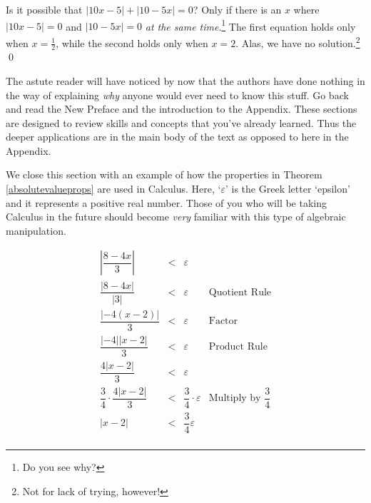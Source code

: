 \documentclass{ximera}
\begin{document}
\begin{example}
\begin{enumerate}
 

Is it possible that $|10x - 5| + |10 - 5x| = 0$?  Only if there is an $x$ where $|10x-5| = 0$ and $|10-5x| = 0$ \textit{at the same time}.\footnote{Do you see why?}  The first equation holds only when $x = \frac{1}{2}$, while the second holds only when $x = 2$.  Alas, we have no solution.\footnote{Not for lack of trying, however!}   \qed

\end{enumerate}

\end{example}

The astute reader will have noticed by now that the authors have done nothing in the way of explaining \emph{why} anyone would ever need to know this stuff.  Go back and read the New Preface and the introduction to the Appendix.  These sections are designed to review skills and concepts that you've already learned.  Thus the deeper applications are in the main body of the text as opposed to here in the Appendix.  

 

We close this section with an example of how the properties in Theorem \ref{absolutevalueprops} are used in Calculus.  Here, `$\varepsilon$' is the Greek letter `epsilon' and it represents a positive real number.  Those of you who will be taking Calculus in the future should become \emph{very} familiar with this type of algebraic manipulation.

\[ \begin{array}{rclr}

\left| \dfrac{8-4x}{3} \right| & < & \varepsilon & \\  

\dfrac{|8 - 4x|}{|3|} & < & \varepsilon & \text{Quotient Rule}\\  

\dfrac{|-4(x-2)|}{3} & < & \varepsilon & \text{Factor} \\  

\dfrac{|-4| |x-2|}{3} & < & \varepsilon & \text{Product Rule} \\  

\dfrac{4 |x-2|}{3} & < & \varepsilon & \\  

\dfrac{3}{4} \cdot \dfrac{4 |x-2|}{3} & < & \dfrac{3}{4} \cdot \varepsilon & \text{Multiply by $\dfrac{3}{4}$} \\  

|x -2 | & < & \dfrac{3}{4} \varepsilon & \\  \end{array}\]





\closegraphsfile
\end{document}

